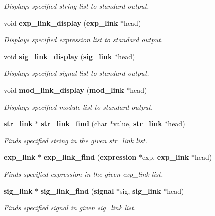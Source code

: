 \begin{CompactItemize}
\begin{CompactList}\small\item\em Displays specified string list to standard output.\item\end{CompactList}\item 
void {\bf exp\_\-link\_\-display} ({\bf exp\_\-link} $\ast$head)
\begin{CompactList}\small\item\em Displays specified expression list to standard output.\item\end{CompactList}\item 
void {\bf sig\_\-link\_\-display} ({\bf sig\_\-link} $\ast$head)
\begin{CompactList}\small\item\em Displays specified signal list to standard output.\item\end{CompactList}\item 
void {\bf mod\_\-link\_\-display} ({\bf mod\_\-link} $\ast$head)
\begin{CompactList}\small\item\em Displays specified module list to standard output.\item\end{CompactList}\item 
{\bf str\_\-link} $\ast$ {\bf str\_\-link\_\-find} (char $\ast$value, {\bf str\_\-link} $\ast$head)
\begin{CompactList}\small\item\em Finds specified string in the given str\_\-link list.\item\end{CompactList}\item 
{\bf exp\_\-link} $\ast$ {\bf exp\_\-link\_\-find} ({\bf expression} $\ast$exp, {\bf exp\_\-link} $\ast$head)
\begin{CompactList}\small\item\em Finds specified expression in the given exp\_\-link list.\item\end{CompactList}\item 
{\bf sig\_\-link} $\ast$ {\bf sig\_\-link\_\-find} ({\bf signal} $\ast$sig, {\bf sig\_\-link} $\ast$head)
\begin{CompactList}\small\item\em Finds specified signal in given sig\_\-link list.\item\end{CompactList}\item 

\end{CompactItemize}
